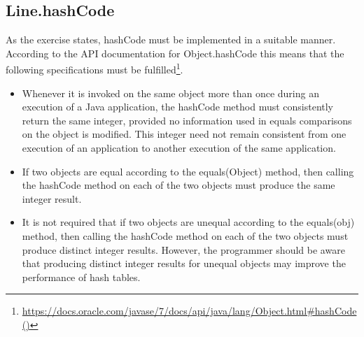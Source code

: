 \subsection{Line.hashCode}
As the exercise states, hashCode must be implemented in a suitable manner. According to the API documentation for Object.hashCode this means that the following specifications must be fulfilled\footnote{\url{https://docs.oracle.com/javase/7/docs/api/java/lang/Object.html#hashCode()}}.
\begin{itemize}
    \item Whenever it is invoked on the same object more than once during an execution of a Java application, the hashCode method must consistently return the same integer, provided no information used in equals comparisons on the object is modified. This integer need not remain consistent from one execution of an application to another execution of the same application.
    \item If two objects are equal according to the equals(Object) method, then calling the hashCode method on each of the two objects must produce the same integer result.
    \item It is not required that if two objects are unequal according to the equals(obj) method, then calling the hashCode method on each of the two objects must produce distinct integer results. However, the programmer should be aware that producing distinct integer results for unequal objects may improve the performance of hash tables.
\end{itemize}

